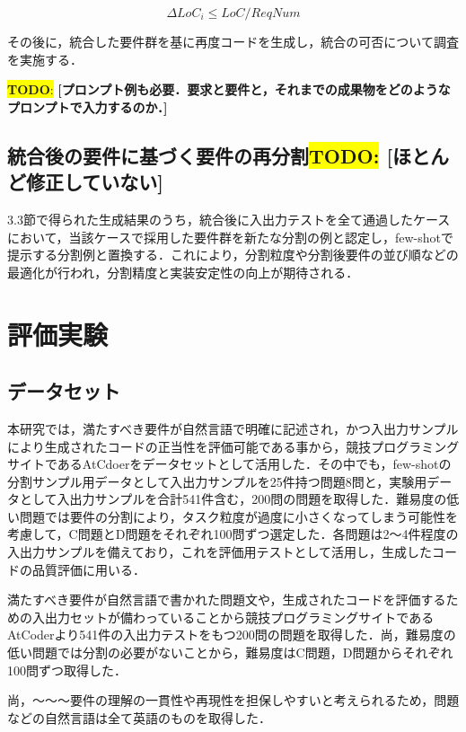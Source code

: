 \documentclass[submit,techrep,noauthor]{ipsj}
\newcommand{\todo}[1]{\colorbox{yellow}{{\bf TODO}:}{\color{red} {\textbf{[#1]}}}}
\begin{document}
\begin{equation}\label{form:delta}
    \Delta LoC_i \leq LoC / ReqNum
\end{equation}

その後に，統合した要件群を基に再度コードを生成し，統合の可否について調査を実施する．

\todo{プロンプト例も必要．要求と要件と，それまでの成果物をどのようなプロンプトで入力するのか．}


\subsection{統合後の要件に基づく要件の再分割\todo{ほとんど修正していない}}
3.3節で得られた生成結果のうち，統合後に入出力テストを全て通過したケースにおいて，当該ケースで採用した要件群を新たな分割の例と認定し，few-shotで提示する分割例と置換する．これにより，分割粒度や分割後要件の並び順などの最適化が行われ，分割精度と実装安定性の向上が期待される．


\section{評価実験}
\label{sec:evaluation}

\subsection{データセット}
本研究では，満たすべき要件が自然言語で明確に記述され，かつ入出力サンプルにより生成されたコードの正当性を評価可能である事から，競技プログラミングサイトであるAtCdoerをデータセットとして活用した．その中でも，few-shotの分割サンプル用データとして入出力サンプルを25件持つ問題8問と，実験用データとして入出力サンプルを合計541件含む，200問の問題を取得した．難易度の低い問題では要件の分割により，タスク粒度が過度に小さくなってしまう可能性を考慮して，C問題とD問題をそれぞれ100問ずつ選定した．各問題は2〜4件程度の入出力サンプルを備えており，これを評価用テストとして活用し，生成したコードの品質評価に用いる．

満たすべき要件が自然言語で書かれた問題文や，生成されたコードを評価するための入出力セットが備わっていることから競技プログラミングサイトであるAtCoder\cite{AtCoder}より541件の入出力テストをもつ200問の問題を取得した．尚，難易度の低い問題では分割の必要がないことから，難易度はC問題，D問題からそれぞれ100問ずつ取得した．

尚，〜〜〜要件の理解の一貫性や再現性を担保しやすいと考えられるため，問題などの自然言語は全て英語のものを取得した．
\end{document}
